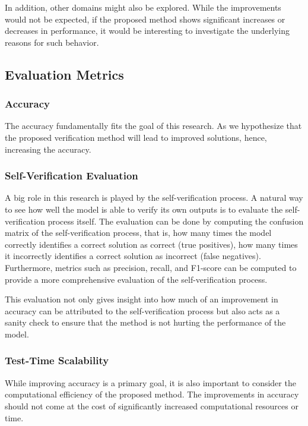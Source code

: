 \documentclass{article}
\begin{document}
In addition, other domains might also be explored. While the improvements would not be expected, if the proposed method shows significant increases or decreases in performance, it would be interesting to investigate the underlying reasons for such behavior.
\subsection{Evaluation Metrics}
\subsubsection{Accuracy}
The accuracy fundamentally fits the goal of this research. As we hypothesize that the proposed verification method will lead to improved solutions, hence, increasing the accuracy.
\subsubsection{Self-Verification Evaluation}
A big role in this research is played by the self-verification process. A natural way to see how well the model is able to verify its own outputs is to evaluate the self-verification process itself. The evaluation can be done by computing the confusion matrix of the self-verification process, that is, how many times the model correctly identifies a correct solution as correct (true positives), how many times it incorrectly identifies a correct solution as incorrect (false negatives). Furthermore, metrics such as precision, recall, and F1-score can be computed to provide a more comprehensive evaluation of the self-verification process. 

This evaluation not only gives insight into how much of an improvement in accuracy can be attributed to the self-verification process but also acts as a sanity check to ensure that the method is not hurting the performance of the model.
\subsubsection{Test-Time Scalability}
While improving accuracy is a primary goal, it is also important to consider the computational efficiency of the proposed method. The improvements in accuracy should not come at the cost of significantly increased computational resources or time. 
\end{document}
